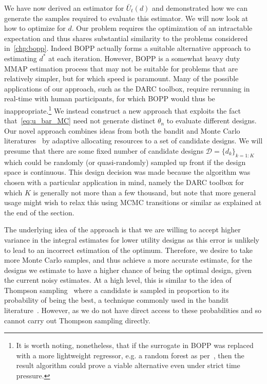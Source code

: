 We have now derived an estimator for $\bar{U}_t(d)$ and demonstrated how we can generate the
samples required to evaluate this estimator.  We will now look at how to optimize for $d$.  
Our problem requires the optimization of an intractable expectation and thus shares substantial
similarity to the problems considered in~\ref{chp:bopp}.  Indeed BOPP actually forms a suitable
alternative approach to estimating $d^*$ at each iteration.  However, BOPP is a somewhat heavy
duty MMAP estimation process that may not be suitable for problems that are relatively simpler,
but for which speed is paramount.  Many of the possible applications of our approach, such
as the DARC toolbox, require rerunning in real-time with human participants, for which BOPP would
thus be inappropriate.\footnote{It is worth noting, nonetheless, that if the surrogate in BOPP
	was replaced with a more lightweight regressor, e.g. a random forest as per~\cite{hutter2011sequential},
	then the result algorithm could prove a viable alternative even under strict time pressure.}
We instead construct a new approach
that exploits the fact that~\eqref{eq:u_bar_MC} need not generate distinct $\theta_n$ to evaluate
different designs.  Our novel approach combines ideas from both the bandit and
Monte Carlo literatures~\citep{amzal2006bayesian,neufeld2014adaptive} by adaptive 
allocating resources to a set of candidate designs.  We will presume that there are some fixed number 
of candidate designs $\mathcal{D} = \{d_k\}_{k=1:K}$ which could be randomly (or quasi-randomly)
sampled up front if the design space is continuous.  This design decision was made because the 
algorithm was chosen with a particular application in mind, namely the DARC toolbox for which $K$
is generally not more than a few thousand, but note that more general usage might wish to
relax this using MCMC transitions or similar as explained at the end of the section.

The underlying idea of the approach is that we are willing to accept higher variance in the integral estimates for lower utility designs as this error is unlikely to lead to an incorrect estimation of the optimum.
Therefore, we desire to take more Monte Carlo samples, and thus achieve a more accurate estimate, for the designs we estimate to have a higher chance of being the optimal design, given the current noisy estimates.
At a high level, this is similar  to the idea of Thompson sampling~\citep{thompson1933likelihood} 
where a candidate is sampled in proportion to its probability of being the best, 
a technique commonly used in the bandit literature~\citep{agrawal2012analysis}.
However, as we do not have direct access to these probabilities and so cannot
carry out Thompson sampling directly.

